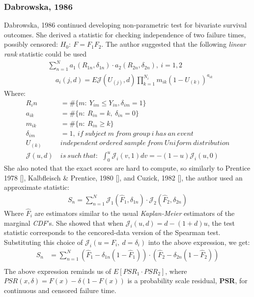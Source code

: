 \documentclass[]{article}
\begin{document}
\subsubsection{Dabrowska, 1986 \cite{dabrowska1986rank}}
Dabrowska, 1986 \cite{dabrowska1986rank} continued developing non-parametric test for bivariate survival outcomes. She derived a statistic for checking independence of two failure times, possibly censored: $H_0:~F=F_1 F_2$.  The author suggested that the following \emph{linear rank} statistic could be used
	$$
	\begin{aligned}
		 &\sum_{n=1}^N a_1(R_{1n}, \delta_{1n})\cdot a_2(R_{2n}, \delta_{2n}), ~i=1,2\\
		 &~~~~~ a_i(j,d) = E\mathcal{J}(U_{(j)}, d)\prod_{k=1}^{N_i} m_{ik}(1-U_{(k)})^{a_{ik}}
	\end{aligned}
	$$
Where: 
	$$
	\begin{aligned}
		 R_in &= \#\{m:~Y_{im} \leq Y_{in}, \delta_{im}=1   \}\\
		 a_{ik} &= \# \{n: ~R_{in}=k,~\delta_{in}=0\}\\
		 m_{ik} &= \# \{n: ~R_{in}\geq k\}\\
		 \delta_{im}&=1,~if~subject ~m~from~group~i~has~an~event\\
		 U_{(k)}~&independent ~ordered~sample~from~Uniform~distribution\\
		 \mathcal{J}(u,d) ~&is~such~that:~~\int_0^u \mathcal{J}_i(v,1)dv = -(1-u)\mathcal{J}_i(u,0)
	\end{aligned}
	$$
She also noted that the exact scores are hard to compute, so similarly to Prentice 1978 [\cite{prentice1978linear}], Kalbfleisch \& Prentice, 1980 [\cite{kalbfleisch2011statistical}], and Cuzick, 1982 [\cite{cuzick1982rank}], the author used an approximate statistic:
	$$
	\begin{aligned}
		 S_n = \sum_{n=1}^N \mathcal{J}_1( \hat{F}_1, \delta_{1n}) \cdot \mathcal{J}_2( \hat{F}_2, \delta_{2n})
	\end{aligned}
	$$
Where $\hat{F}_i$ are estimators similar to the usual \emph{Kaplan-Meier} estimators of the marginal \emph{CDF}'s. She showed that when $\mathcal{J}_i(u,d) =d-(1+d)u$, the test statistic corresponds to the cencored-data version of the Spearman test. Substituting this choice of $\mathcal{J}_i(u=F_i,~d=\delta_i)$ into the above expression, we get:
	$$
	\begin{aligned}
		 S_n &= \sum_{n=1}^N (\hat{F}_1 - \delta_{1n}(1-\hat{F}_1))\cdot (\hat{F}_2 - \delta_{2n}(1-\hat{F}_2))\\
	\end{aligned}
	$$
The above expression reminds us of $E[PSR_1 \cdot PSR_2]$, where $PSR(x, \delta) = F(x)-\delta(1-F(x))$ is a probability scale residual, \textbf{PSR}, for continuous and censored failure time. 
\end{document}
